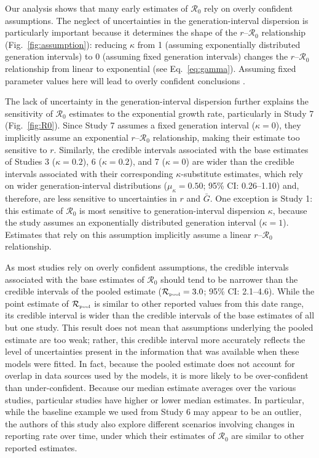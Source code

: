 \documentclass[12pt]{article}
\newcommand{\eref}[1]{Eq.~\ref{eq:#1}}
\newcommand{\fref}[1]{Fig.~\ref{fig:#1}}
\newcommand{\Ro}{\ensuremath{{\mathcal R}_{0}}\xspace}
\newcommand{\Rpool}{\ensuremath{{\mathcal R}_{\textrm{\tiny{pool}}}}\xspace}
\begin{document}
Our analysis shows that many early estimates of \Ro rely on overly confident assumptions.
The neglect of uncertainties in the generation-interval dispersion is particularly important because it determines the shape of the $r$--\Ro relationship (\fref{assumption}):
reducing $\kappa$ from 1 (assuming exponentially distributed generation intervals) to 0 (assuming fixed generation intervals) changes the $r$--\Ro relationship from linear to exponential (see \eref{gamma}).
Assuming fixed parameter values here will lead to overly confident conclusions \citep{elderd2006uncertainty}.

The lack of uncertainty in the generation-interval dispersion further explains the sensitivity of \Ro estimates to the exponential growth rate, particularly in Study 7 (\fref{R0}).
Since Study 7 assumes a fixed generation interval ($\kappa=0$), they implicitly assume an exponential $r$--\Ro relationship, making their estimate too sensitive to $r$.
Similarly, the credible intervals associated with the base estimates of Studies 3 ($\kappa=0.2$), 6  ($\kappa=0.2$), and 7 ($\kappa=0$) are wider than the credible intervals associated with their corresponding $\kappa$-substitute estimates, which rely on wider generation-interval distributions ($\mu_\kappa=0.50$; 95\% CI: 0.26--1.10) and, therefore, are less sensitive to uncertainties in $r$ and $\bar G$.
One exception is Study 1: this estimate of \Ro is most sensitive to generation-interval dispersion $\kappa$,
because the study assumes an exponentially distributed generation interval ($\kappa=1$). 
Estimates that rely on this assumption implicitly assume a linear $r$--\Ro relationship.

As most studies rely on overly confident assumptions, the credible intervals associated with the base estimates of \Ro should tend to be narrower than the credible intervals of the pooled estimate ($\Rpool = 3.0$; 95\% CI: 2.1--4.6).
While the point estimate of \Rpool is similar to other reported values from this date range, its credible interval is wider than the credible intervals of the base estimates of all but one study.
This result does not mean that assumptions underlying the pooled estimate are too weak;
rather, this credible interval more accurately reflects the level of uncertainties present in the information that was available when these models were fitted.
In fact, because the pooled estimate does not account for overlap in data sources used by the models, it is more likely to be over-confident than under-confident.
Because our median estimate averages over the various studies, particular studies have higher or lower median estimates.
In particular, while the baseline example we used from Study 6 may appear to be an outlier, the authors of this study also explore different scenarios involving changes in reporting rate over time, under which their estimates of \Ro are similar to other reported estimates.
\end{document}
